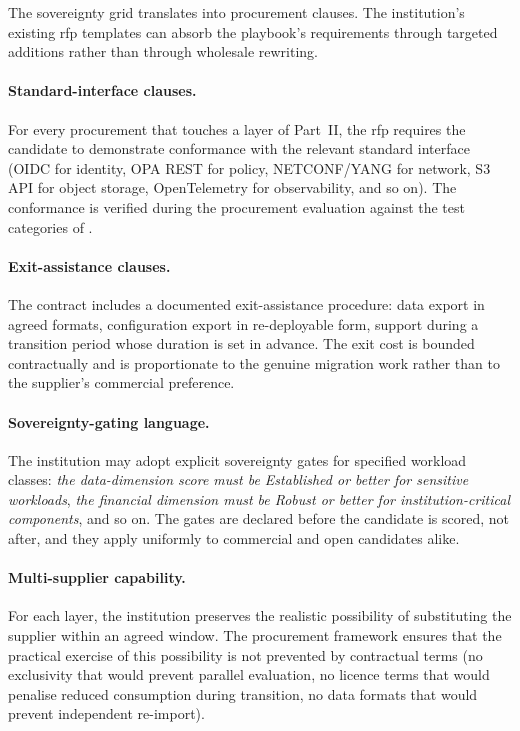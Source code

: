 The sovereignty grid translates into procurement clauses. The
institution's existing \gls{rfp} templates can absorb the
playbook's requirements through targeted additions rather than
through wholesale rewriting.

\paragraph{Standard-interface clauses.} For every procurement
that touches a layer of Part~II, the \gls{rfp} requires the
candidate to demonstrate conformance with the relevant standard
interface (OIDC for identity, OPA REST for policy, NETCONF/YANG
for network, S3 API for object storage, OpenTelemetry for
observability, and so on). The conformance is verified during
the procurement evaluation against the test categories of
.

\paragraph{Exit-assistance clauses.} The contract includes a
documented exit-assistance procedure: data export in agreed
formats, configuration export in re-deployable form, support
during a transition period whose duration is set in advance.
The exit cost is bounded contractually and is proportionate to
the genuine migration work rather than to the supplier's
commercial preference.

\paragraph{Sovereignty-gating language.} The institution may
adopt explicit sovereignty gates for specified workload classes:
\emph{the data-dimension score must be Established or better for
sensitive workloads}, \emph{the financial dimension must be
Robust or better for institution-critical components}, and so
on. The gates are declared before the candidate is scored, not
after, and they apply uniformly to commercial and open
candidates alike.

\paragraph{Multi-supplier capability.} For each layer, the
institution preserves the realistic possibility of substituting
the supplier within an agreed window. The procurement framework
ensures that the practical exercise of this possibility is not
prevented by contractual terms (no exclusivity that would
prevent parallel evaluation, no licence terms that would
penalise reduced consumption during transition, no data formats
that would prevent independent re-import).
